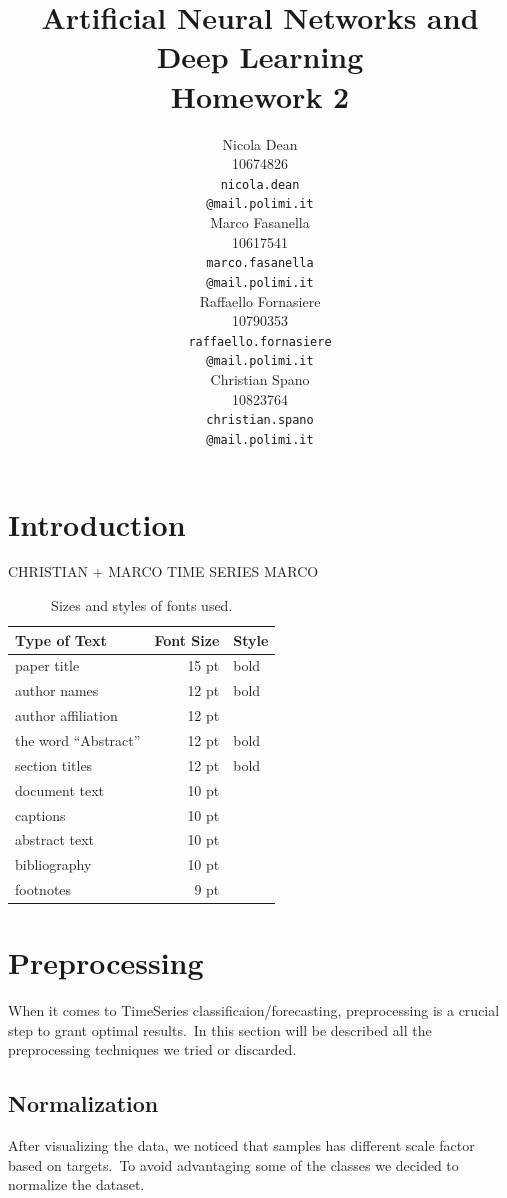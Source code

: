 \documentclass[11pt]{article}
\title{Artificial Neural Networks and Deep Learning \\
Homework 2}
\author{
  Nicola Dean \\
  10674826 \\
  {\tt nicola.dean \\
  \tt @mail.polimi.it} \\\And
  Marco Fasanella \\
  10617541 \\
  {\tt marco.fasanella \\
  \tt @mail.polimi.it} \\\And
  Raffaello Fornasiere \\
    10790353 \\
    {\tt raffaello.fornasiere \\
    \tt @mail.polimi.it} \\\And
  Christian Spano \\
  10823764 \\
  {\tt christian.spano \\
  \tt @mail.polimi.it} \\}
\date{}
\begin{document}
\maketitle


\section{Introduction}


CHRISTIAN + MARCO
TIME SERIES MARCO
\begin{table}[h]
\begin{center}
\begin{tabular}{|l|rl|}
\hline \bf Type of Text & \bf Font Size & \bf Style \\ \hline
paper title & 15 pt & bold \\
author names & 12 pt & bold \\
author affiliation & 12 pt & \\
the word ``Abstract'' & 12 pt & bold \\
section titles & 12 pt & bold \\
document text & 10 pt  &\\
captions & 10 pt & \\
abstract text & 10 pt & \\
bibliography & 10 pt & \\
footnotes & 9 pt & \\
\hline
\end{tabular}
\end{center}
\caption{\label{fontsizes} Sizes and styles of fonts used.}
\end{table}




\section{Preprocessing}
When it comes to TimeSeries classificaion/forecasting, preprocessing is a crucial step to grant optimal results.\
In this section will be described all the preprocessing techniques we tried or discarded.
\subsection{Normalization}
After visualizing the data, we noticed that samples has different scale factor based on targets.\
To avoid advantaging some of the classes we decided to normalize the dataset.
\end{document}
